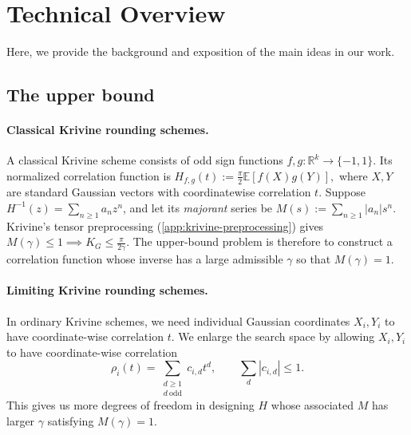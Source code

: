 \section{Technical Overview}

Here, we provide the background and exposition of the main ideas in our work.

\subsection{The upper bound}

\paragraph{Classical Krivine rounding schemes.}
A classical Krivine scheme consists of odd sign functions \(f,g:\mathbb R^k\to\{-1,1\}\). Its normalized correlation function is
\(
    H_{f,g}(t):=\frac{\pi}{2}\mathbb E[f(X)g(Y)],
\)
where \(X,Y\) are standard Gaussian vectors with coordinatewise correlation \(t\). Suppose \(H^{-1}(z)=\sum_{n\geq 1}a_nz^n\), and let its \emph{majorant} series be  \(M(s):=\sum_{n\geq 1}|a_n|s^n\). Krivine's tensor preprocessing
(\cref{app:krivine-preprocessing})
gives
\(
    M(\gamma)\leq 1
    \implies 
    K_G\leq\frac{\pi}{2\gamma}.
\)
The upper-bound problem is therefore to construct a correlation function whose inverse has a large admissible  $\gamma$ so that $M(\gamma) = 1$.


\paragraph{Limiting Krivine rounding schemes.}
In ordinary Krivine schemes, we need individual Gaussian coordinates $X_i, Y_i$ to have coordinate-wise correlation $t$. We enlarge the search space by allowing $X_i, Y_i$ to have coordinate-wise correlation
\[
    \rho_i(t)=\sum_{\substack{d\geq 1\\ d\ \mathrm{odd}}}c_{i,d}t^d,
    \qquad
    \sum_d|c_{i,d}|\leq 1.
\]
This gives us more degrees of freedom in designing \(H\) whose associated \(M\) has larger \(\gamma\) satisfying $M(\gamma) = 1$.



